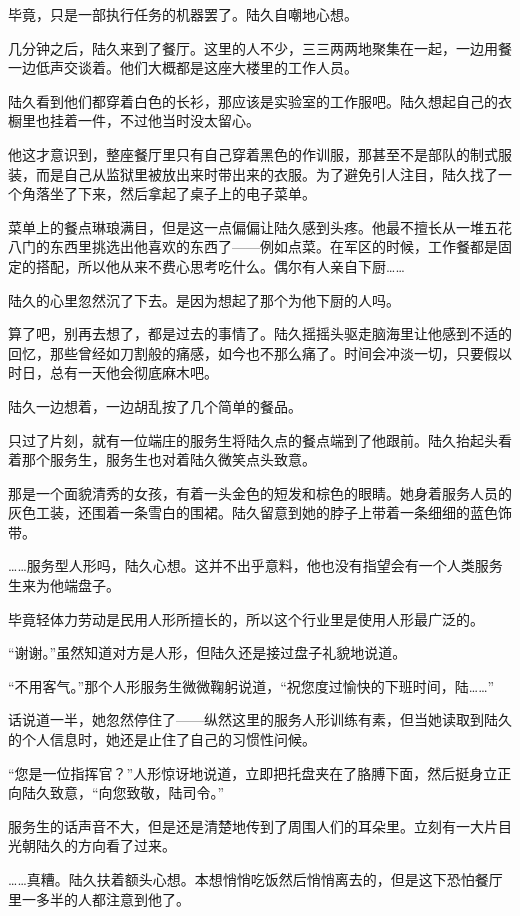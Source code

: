 毕竟，只是一部执行任务的机器罢了。陆久自嘲地心想。

几分钟之后，陆久来到了餐厅。这里的人不少，三三两两地聚集在一起，一边用餐一边低声交谈着。他们大概都是这座大楼里的工作人员。

陆久看到他们都穿着白色的长衫，那应该是实验室的工作服吧。陆久想起自己的衣橱里也挂着一件，不过他当时没太留心。

他这才意识到，整座餐厅里只有自己穿着黑色的作训服，那甚至不是部队的制式服装，而是自己从监狱里被放出来时带出来的衣服。为了避免引人注目，陆久找了一个角落坐了下来，然后拿起了桌子上的电子菜单。

菜单上的餐点琳琅满目，但是这一点偏偏让陆久感到头疼。他最不擅长从一堆五花八门的东西里挑选出他喜欢的东西了——例如点菜。在军区的时候，工作餐都是固定的搭配，所以他从来不费心思考吃什么。偶尔有人亲自下厨……

陆久的心里忽然沉了下去。是因为想起了那个为他下厨的人吗。

算了吧，别再去想了，都是过去的事情了。陆久摇摇头驱走脑海里让他感到不适的回忆，那些曾经如刀割般的痛感，如今也不那么痛了。时间会冲淡一切，只要假以时日，总有一天他会彻底麻木吧。

陆久一边想着，一边胡乱按了几个简单的餐品。

只过了片刻，就有一位端庄的服务生将陆久点的餐点端到了他跟前。陆久抬起头看着那个服务生，服务生也对着陆久微笑点头致意。

那是一个面貌清秀的女孩，有着一头金色的短发和棕色的眼睛。她身着服务人员的灰色工装，还围着一条雪白的围裙。陆久留意到她的脖子上带着一条细细的蓝色饰带。

……服务型人形吗，陆久心想。这并不出乎意料，他也没有指望会有一个人类服务生来为他端盘子。

毕竟轻体力劳动是民用人形所擅长的，所以这个行业里是使用人形最广泛的。

“谢谢。”虽然知道对方是人形，但陆久还是接过盘子礼貌地说道。

“不用客气。”那个人形服务生微微鞠躬说道，“祝您度过愉快的下班时间，陆……”

话说道一半，她忽然停住了——纵然这里的服务人形训练有素，但当她读取到陆久的个人信息时，她还是止住了自己的习惯性问候。

“您是一位指挥官？”人形惊讶地说道，立即把托盘夹在了胳膊下面，然后挺身立正向陆久致意，“向您致敬，陆司令。”

服务生的话声音不大，但是还是清楚地传到了周围人们的耳朵里。立刻有一大片目光朝陆久的方向看了过来。

……真糟。陆久扶着额头心想。本想悄悄吃饭然后悄悄离去的，但是这下恐怕餐厅里一多半的人都注意到他了。


